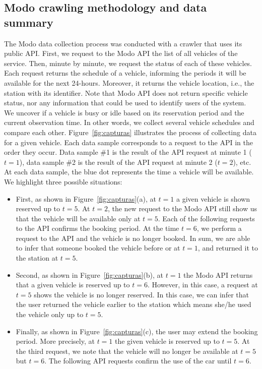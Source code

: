 \subsection{Modo crawling methodology and data summary}



The Modo data collection process was conducted with a crawler that uses its public API. 
First, we request to the Modo API the list of all vehicles of the service. 
Then, minute by minute, we request the status of each of these vehicles. Each request returns the schedule of a vehicle, informing the periods it will be available for the next 24-hours. Moreover, it returns the vehicle location, i.e., the station with its identifier. 
Note that Modo API does not return specific vehicle status, nor any information that could be used to identify users of the system. We uncover if a vehicle is busy or idle based on its reservation period and the current observation time. In other words, we collect several vehicle schedules and compare each other.
Figure~\ref{fig:capturas} illustrates the process of collecting data for a given vehicle. Each data sample corresponds to a request to the API in the order they occur. Data sample \#1 is the result of the API request at minute 1 ($t=1$), data sample \#2 is the result of the API request at minute 2 ($t=2$), etc. At each data sample, the blue dot represents the time a vehicle will be available. We highlight three possible situations:

\begin{itemize}
\item First, as shown in Figure~\ref{fig:capturas}(a), at $t=1$ a given vehicle is shown reserved up to $t=5$.  At $t=2$, the new request to the Modo API still show us that the vehicle will be available only at $t=5$. Each of the following requests to the API confirms the booking period. At the time $t=6$, we perform a request to the API and the vehicle is no longer booked. In sum, we are able to infer that someone booked the vehicle before or at $t=1$, and returned it to the station at $t=5$.

\item Second, as shown in Figure~\ref{fig:capturas}(b), at $t=1$  the Modo API returns that a given vehicle is reserved up to $t=6$.  However, in this case, a request at $t=5$ shows the vehicle is no longer reserved. In this case, we can infer that the user returned the vehicle earlier to the station which means she/he used the vehicle only up to $t=5$.

\item Finally, as shown in Figure~\ref{fig:capturas}(c), the user may extend the booking period. More precisely, at $t=1$ the given vehicle is reserved up to $t=5$. At the third request, we note that the vehicle will no longer be available at $t=5$ but $t=6$. The following API requests confirm the use of the car until $t=6$.
\end{itemize}


